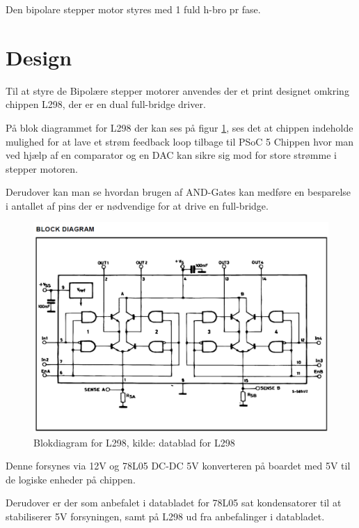 Den bipolare stepper motor styres med 1 fuld h-bro pr fase.

\section{Design}
Til at styre de Bipolære stepper motorer anvendes der et print designet omkring chippen L298, der er en dual full-bridge driver.

På blok diagrammet for L298 der kan ses på figur \ref{blok298}, ses det at chippen indeholde mulighed for at lave et strøm feedback loop tilbage til PSoC 5
Chippen hvor man ved hjælp af en comparator og en DAC kan sikre sig mod for store strømme i stepper motoren. 

Derudover kan man se hvordan brugen af AND-Gates kan medføre en besparelse i antallet af pins der er nødvendige for at drive en full-bridge.

\begin{figure}[H]
	\centering
	\includegraphics[scale=0.5]{Billeder/blokdiagramL298}
	\caption{Blokdiagram for L298, kilde: datablad for L298}
	\label{blok298}
\end{figure}

Denne forsynes via 12V og 78L05 DC-DC 5V konverteren på boardet med 5V til de logiske enheder på chippen.

Derudover er der som anbefalet i databladet for 78L05 sat kondensatorer til at stabiliserer 5V forsyningen, samt på L298 ud fra anbefalinger i databladet.

